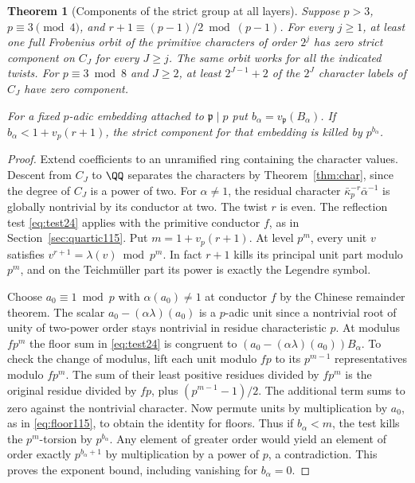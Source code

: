 \documentclass[a4paper,11pt]{article}
\newtheorem{theorem}[proposition]{Theorem}
\theoremstyle{definition}
\theoremstyle{remark}
\numberwithin{equation}{section}
\begin{document}
\begin{theorem}[Components of the strict group at all layers]
\label{thm:half139}
Suppose \(p>3\), \(p\equiv3\pmod4\), and
\(r+1\equiv(p-1)/2\bmod(p-1)\). For every \(j\ge1\), at least
one full Frobenius orbit of the primitive characters of order
\(2^j\) has zero strict component on \(C_J\) for every \(J\ge j\).
The same orbit works for all the indicated twists.
For \(p\equiv3\bmod8\) and \(J\ge2\), at least \(2^{J-1}+2\)
of the \(2^J\) character labels of \(C_J\) have zero component.

For a fixed \(p\)-adic embedding attached to \(\mathfrak p\mid p\)
put \(b_\alpha=v_{\mathfrak p}(B_\alpha)\). If
\(b_\alpha<1+v_p(r+1)\), the strict component for that embedding
is killed by \(p^{b_\alpha}\).
\end{theorem}
\begin{proof}
Extend coefficients to an unramified ring containing the
character values. Descent from \(C_J\) to \(\QQ\) separates the
characters by Theorem~\ref{thm:char}, since the degree of \(C_J\)
is a power of two. For \(\alpha\ne1\), the residual character
\(\bar\kappa_p^{-r}\bar\alpha^{-1}\) is globally nontrivial
by its conductor at two. The twist \(r\) is even. The reflection
test \eqref{eq:test24} applies with the primitive conductor \(f\),
as in Section~\ref{sec:quartic115}.
Put \(m=1+v_p(r+1)\). At level \(p^m\), every unit \(v\)
satisfies \(v^{r+1}=\lambda(v)\bmod p^m\). In fact \(r+1\)
kills its principal unit part modulo \(p^m\), and on the
Teichm\"uller part its power is exactly the Legendre symbol.

Choose \(a_0\equiv1\bmod p\) with \(\alpha(a_0)\ne1\) at
conductor \(f\) by the Chinese remainder theorem. The scalar
\(a_0-(\alpha\lambda)(a_0)\) is a \(p\)-adic unit since a
nontrivial root of unity of two-power order stays nontrivial
in residue characteristic \(p\). At modulus \(fp^m\) the floor
sum in \eqref{eq:test24} is congruent to
\((a_0-(\alpha\lambda)(a_0))B_\alpha\).
To check the change of modulus, lift each unit modulo \(fp\)
to its \(p^{m-1}\) representatives modulo \(fp^m\). The sum of
their least positive residues divided by \(fp^m\) is the
original residue divided by \(fp\), plus \((p^{m-1}-1)/2\).
The additional term sums to zero against the nontrivial
character. Now permute units by multiplication by \(a_0\),
as in \eqref{eq:floor115}, to obtain the identity for floors.
Thus if \(b_\alpha<m\), the test kills the \(p^m\)-torsion by
\(p^{b_\alpha}\). Any element of greater order would yield
an element of order exactly \(p^{b_\alpha+1}\) by multiplication
by a power of \(p\), a contradiction. This proves the exponent
bound, including vanishing for \(b_\alpha=0\).


\end{proof}
\end{document}
